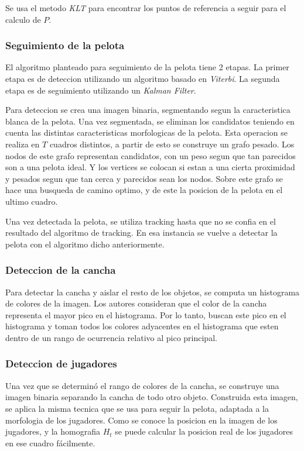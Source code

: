 \documentclass[a4paper,10pt]{article}
\begin{document}
Se usa el metodo \textit{KLT} \cite{KLT} para encontrar los puntos de referencia a seguir para el calculo de $P$.

\subsubsection*{Seguimiento de la pelota}

El algoritmo planteado para seguimiento de la pelota tiene 2 etapas.
La primer etapa es de deteccion utilizando un algoritmo basado en \textit{Viterbi}.
La segunda etapa es de seguimiento utilizando un \textit{Kalman Filter}.

Para deteccion se crea una imagen binaria, segmentando segun la caracteristica blanca de la pelota.
Una vez segmentada, se eliminan los candidatos teniendo en cuenta las distintas caracteristicas morfologicas de la pelota.
Esta operacion se realiza en $T$ cuadros distintos, a partir de esto se construye un grafo pesado.
Los nodos de este grafo representan candidatos, con un peso segun que tan parecidos son a una pelota ideal.
Y los vertices se colocan si estan a una cierta proximidad y pesados segun que tan cerca y parecidos sean los nodos.
Sobre este grafo se hace una busqueda de camino optimo, y de este la posicion de la pelota en el ultimo cuadro.

Una vez detectada la pelota, se utiliza tracking hasta que no se confia en el resultado del algoritmo de tracking.
En esa instancia se vuelve a detectar la pelota con el algoritmo dicho anteriormente.

\subsubsection*{Deteccion de la cancha}

Para detectar la cancha y aislar el resto de los objetos, se computa un histograma de colores de la imagen.
Los autores consideran que el color de la cancha representa el mayor pico en el histograma.
Por lo tanto, buscan este pico en el histograma y toman todos los colores adyacentes en el histograma que esten dentro de un rango de ocurrencia relativo al pico principal.

\subsubsection*{Deteccion de jugadores}

Una vez que se determinó el rango de colores de la cancha, se construye una imagen binaria separando la cancha de todo otro objeto.
Construida esta imagen, se aplica la misma tecnica que se usa para seguir la pelota, adaptada a la morfologia de los jugadores.
Como se conoce la posicion en la imagen de los jugadores, y la homografia $H_t$ se puede calcular la posicion real de los jugadores en ese cuadro fácilmente.

\printbibliography
\end{document}
